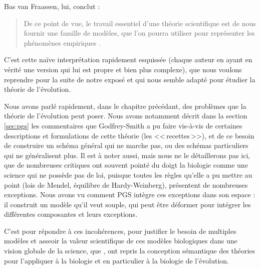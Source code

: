 Bas van Fraassen, lui, conclut :
\begin{quote}
	De ce point de vue, le travail essentiel d'une théorie scientifique est de nous fournir une famille de modèles, que l'on pourra utiliser pour représenter les phénomènes empiriques \citep{vanfraassen1972aformalapproachtothephilosophyofscience}.
\end{quote}

C'est cette naïve interprétation rapidement esquissée (chaque auteur en ayant en vérité une version qui lui est propre et bien plus complexe), que nous voulons reprendre pour la suite de notre exposé et qui nous semble adapté pour étudier la théorie de l'évolution.

Nous avons parlé rapidement, dans le chapitre précédant, des problèmes que la théorie de l'évolution peut poser. Nous avons notamment décrit dans la section \ref{sec:pgs} les commentaires que Godfrey-Smith a pu faire vis-à-vis de certaines descriptions et formulations de cette théorie (les <<\,recettes\,>>), et de ce besoin de construire un schéma général qui ne marche pas, ou des schémas particuliers qui ne généralisent plus. Il est à noter aussi, mais nous ne le détaillerons pas ici, que de nombreuses critiques ont souvent pointé du doigt la biologie comme une science qui ne possède pas de loi, puisque toutes les règles qu'elle a pu mettre au point (lois de Mendel, équilibre de Hardy-Weinberg), présentent de nombreuses exceptions. Nous avons vu comment PGS intègre ces exceptions dans son espace : il construit un modèle qu'il veut souple, qui peut être déformer pour intégrer les différentes composantes et leurs exceptions. 

C'est pour répondre à ces incohérences, pour justifier le besoin de multiples modèles et asseoir la valeur scientifique de ces modèles biologiques dans une vision globale de la science, que \cite{beatty1980whatswrongwithreceivedwiew,beatty1980ptimaldesignmodelsandstrategyofmodelbuildinginevolutionarybiology,beatty1987onbehalfofsemanticview,thompson1989thestructureofbiologicaltheories,thompson1987adefenceofthesemanticconceptionofevolutionarytheory,lloyd1984asmanticapproachtothestructureofpopulationgenetics,lloyd1988thesemanticapproachanditsapplicationtoevolutionarytheory}, ont repris la conception sémantique des théories pour l'appliquer à la biologie et en particulier à la biologie de l'évolution.

